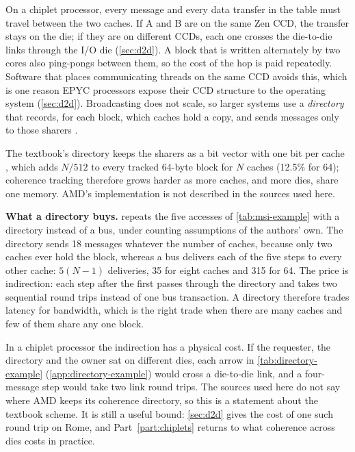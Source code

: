 On a chiplet processor, every message and every data transfer in the table must travel between the two caches. If A and B are on the same Zen CCD, the transfer stays on the die; if they are on different CCDs, each one crosses the die-to-die links through the I/O die (\cref{sec:d2d}). A block that is written alternately by two cores also ping-pongs between them, so the cost of the hop is paid repeatedly. Software that places communicating threads on the same CCD avoids this, which is one reason EPYC processors expose their CCD structure to the operating system (\cref{sec:d2d}). Broadcasting does not scale, so larger systems use a \emph{directory} that records, for each block, which caches hold a copy, and sends messages only to those sharers \cite[sec.~12.4.6]{sarangi2025basic}.

The textbook's directory keeps the sharers as a bit vector with one bit per cache \cite[sec.~12.4.6]{sarangi2025basic}, which adds $N/512$ to every tracked 64-byte block for $N$ caches (12.5\% for 64); coherence tracking therefore grows harder as more caches, and more dies, share one memory. AMD's implementation is not described in the sources used here.

\textbf{What a directory buys.}  repeats the five accesses of \cref{tab:msi-example} with a directory instead of a bus, under counting assumptions of the authors' own. The directory sends 18 messages whatever the number of caches, because only two caches ever hold the block, whereas a bus delivers each of the five steps to every other cache: $5(N-1)$ deliveries, 35 for eight caches and 315 for 64. The price is indirection: each step after the first passes through the directory and takes two sequential round trips instead of one bus transaction. A directory therefore trades latency for bandwidth, which is the right trade when there are many caches and few of them share any one block.

In a chiplet processor the indirection has a physical cost. If the requester, the directory and the owner sat on different dies, each arrow in \cref{tab:directory-example} (\cref{app:directory-example}) would cross a die-to-die link, and a four-message step would take two link round trips. The sources used here do not say where AMD keeps its coherence directory, so this is a statement about the textbook scheme. It is still a useful bound: \cref{sec:d2d} gives the cost of one such round trip on Rome, and Part~\ref{part:chiplets} returns to what coherence across dies costs in practice.

